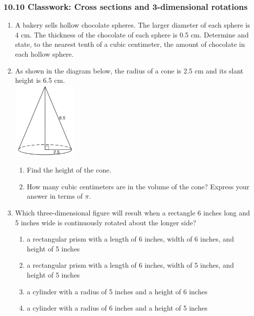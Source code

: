 \documentclass[12pt, twoside]{article}
\begin{document}
\subsubsection*{10.10 Classwork: Cross sections and 3-dimensional rotations}
 \begin{enumerate}

   \item A bakery sells hollow chocolate spheres. The larger diameter of each sphere is 4 cm. The thickness of the chocolate of each sphere is 0.5 cm. Determine and state, to the nearest tenth of a cubic centimeter, the amount of chocolate in each hollow sphere.\\[0.5cm]


   \item As shown in the diagram below, the radius of a cone is 2.5 cm and its slant height is 6.5 cm.\\[0.5cm]
     \includegraphics[width=0.25\textwidth]{cone_Jan2019-23.png}
     \begin{enumerate}
       \item Find the height of the cone. \vspace{1cm}
       \item How many cubic centimeters are in the volume of the cone? Express your answer in terms of $\pi$.
   \end{enumerate} \vspace{2.5cm}

  \item Which three-dimensional figure will result when a rectangle 6 inches long and 5 inches wide is continuously rotated about the longer side?
    \begin{enumerate}
      \item a rectangular prism with a length of 6 inches, width of 6 inches, and height of 5 inches
      \item a rectangular prism with a length of 6 inches, width of 5 inches, and height of 5 inches
      \item a cylinder with a radius of 5 inches and a height of 6 inches
      \item a cylinder with a radius of 6 inches and a height of 5 inches
    \end{enumerate}


\end{enumerate}
\end{document}
